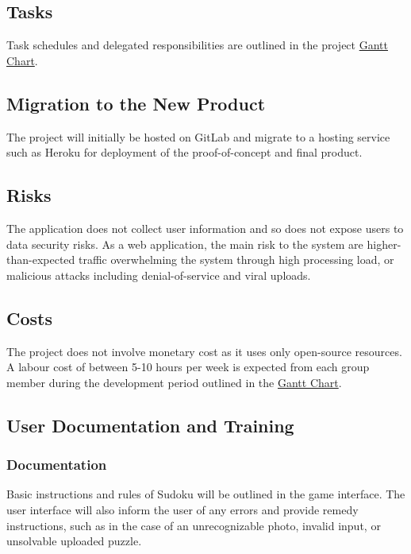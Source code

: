\documentclass[11pt]{article}
\begin{document}
\subsection{Tasks}
Task schedules and delegated responsibilities are outlined in the project \href{https://gitlab.cas.mcmaster.ca/bhuiyr2/sudokusolver_l02_grp08/-/blob/main/ProjectSchedule/Gantt_Sudoku.pdf}{Gantt Chart}.

\subsection{Migration to the New Product}
The project will initially be hosted on GitLab and migrate to a hosting service such as Heroku for deployment of the proof-of-concept and final product.

\subsection{Risks}
The application does not collect user information and so does not expose users to data security risks. As a web application, the main risk to the system are higher-than-expected traffic overwhelming the system through high processing load, or malicious attacks including denial-of-service and viral uploads.

\subsection{Costs}
The project does not involve monetary cost as it uses only open-source resources. A labour cost of between 5-10 hours per week is expected from each group member during the development period outlined in the \href{https://gitlab.cas.mcmaster.ca/bhuiyr2/sudokusolver_l02_grp08/-/blob/main/ProjectSchedule/Gantt_Sudoku.pdf}{Gantt Chart}.

\subsection{User Documentation and Training}
\subsubsection{Documentation}
Basic instructions and rules of Sudoku will be outlined in the game interface. The user interface will also inform the user of any errors and provide remedy instructions, such as in the case of an unrecognizable photo, invalid input, or unsolvable uploaded puzzle.
\end{document}
